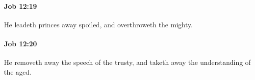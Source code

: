 		\paragraph{Job 12:19} %
			\label{JOB-12-19}

			He leadeth princes away spoiled, and overthroweth the mighty.


		\paragraph{Job 12:20} %
			\label{JOB-12-20}

			He removeth away the speech of the trusty, and taketh away the understanding of the aged.


